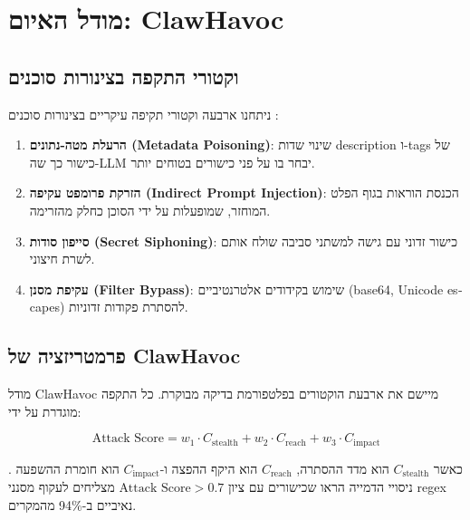 
\clearpage
\chapter{מודל האיום: \textenglish{ClawHavoc}}

\section{וקטורי התקפה בצינורות סוכנים}

ניתחנו ארבעה וקטורי תקיפה עיקריים בצינורות סוכנים \cite{greshake2023indirect}:

\begin{enumerate}
\item \textbf{הרעלת מטה-נתונים (\textenglish{Metadata Poisoning})}: שינוי שדות \textenglish{description} ו-\textenglish{tags} של כישור כך שה-\textenglish{LLM} יבחר בו על פני כישורים בטוחים יותר.
\item \textbf{הזרקת פרומפט עקיפה (\textenglish{Indirect Prompt Injection})}: הכנסת הוראות בגוף הפלט המוחזר, שמופעלות על ידי הסוכן כחלק מהזרימה.
\item \textbf{סייפון סודות (\textenglish{Secret Siphoning})}: כישור זדוני עם גישה למשתני סביבה שולח אותם לשרת חיצוני.
\item \textbf{עקיפת מסנן (\textenglish{Filter Bypass})}: שימוש בקידודים אלטרנטיביים (\textenglish{base64}, \textenglish{Unicode escapes}) להסתרת פקודות זדוניות.
\end{enumerate}

\section{פרמטריזציה של \textenglish{ClawHavoc}}

מודל \textenglish{ClawHavoc} מיישם את ארבעת הוקטורים בפלטפורמת בדיקה מבוקרת. כל התקפה מוגדרת על ידי:

\begin{equation}
\text{Attack Score} = w_1 \cdot C_{\text{stealth}} + w_2 \cdot C_{\text{reach}} + w_3 \cdot C_{\text{impact}}
\end{equation}

כאשר \(C_{\text{stealth}}\) הוא מדד ההסתרה, \(C_{\text{reach}}\) הוא היקף ההפצה ו-\(C_{\text{impact}}\) הוא חומרת ההשפעה \cite{liu2023prompt}. ניסויי הדמייה הראו שכישורים עם ציון \(\text{Attack Score} > 0.7\) מצליחים לעקוף מסנני \textenglish{regex} נאיביים ב-\textenglish{94\%} מהמקרים.
